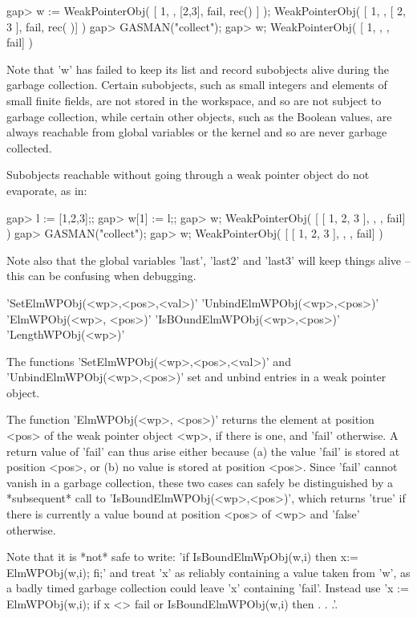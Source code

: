 \begintt
    gap> w := WeakPointerObj( [ 1, , [2,3], fail, rec() ] );
    WeakPointerObj( [ 1, , [ 2, 3 ], fail, rec(
       )] )
    gap> GASMAN("collect");
    gap> w;
    WeakPointerObj( [ 1, , , fail] )
\endtt

Note that 'w' has failed to keep its  list and record subobjects alive during
the garbage    collection.  Certain subobjects, such  as   small integers and
elements of small finite fields, are not stored in  the workspace, and so are
not subject  to garbage collection, while certain  other objects, such as the
Boolean values, are always reachable from  global variables or the kernel and
so are never garbage collected.

Subobjects reachable without  going  through  a weak  pointer object  do  not
evaporate, as in:

\begintt
   gap> l := [1,2,3];;
   gap> w[1] := l;;
   gap> w;
   WeakPointerObj( [ [ 1, 2, 3 ], , , fail] )
   gap> GASMAN("collect");
   gap> w;                
   WeakPointerObj( [ [ 1, 2, 3 ], , , fail] )
\endtt

Note also  that the global  variables  'last', 'last2' and 'last3'  will keep
things alive -- this can be confusing when debugging.


\>'SetElmWPObj(<wp>,<pos>,<val>)'
\>'UnbindElmWPObj(<wp>,<pos>)'
\>'ElmWPObj(<wp>, <pos>)'
\>'IsBOundElmWPObj(<wp>,<pos>)'
\>'LengthWPObj(<wp>)'

The          functions           'SetElmWPObj(<wp>,<pos>,<val>)'          and
'UnbindElmWPObj(<wp>,<pos>)' set and unbind entries in a weak pointer object.

The function 'ElmWPObj(<wp>, <pos>)' returns the element at position <pos> of
the weak pointer object <wp>, if there is one, and 'fail' otherwise. A return
value of 'fail' can thus arise either because (a)  the value 'fail' is stored
at position <pos>, or (b) no value is stored  at position <pos>. Since 'fail'
cannot   vanish in  a  garbage collection,   these   two cases can  safely be
distinguished by  a *subsequent* call to 'IsBoundElmWPObj(<wp>,<pos>)', which
returns 'true' if there is currently a value bound at  position <pos> of <wp>
and 'false' otherwise.

Note that it  is  *not*  safe to write:   'if IsBoundElmWpObj(w,i)  then  x:=
ElmWPObj(w,i); fi;'  and treat 'x' as  reliably containing a value taken from
'w', as a badly  timed garbage collection could  leave 'x' containing 'fail'. 
Instead use 'x := ElmWPObj(w,i); if x <> fail or  IsBoundElmWPObj(w,i) then . 
. .'.


